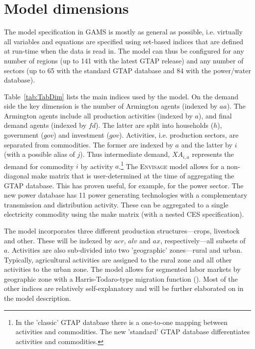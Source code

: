 \documentclass[11pt,letterpaper]{report}
\begin{document}
\section{Model dimensions}

The model specification in GAMS is mostly as general as possible, i.e. virtually
all variables and equations are specified using set-based indices that are
defined at run-time when the data is read in. The model can thus be configured
for any number of regions (up to 141 with the latest GTAP release) and any
number of sectors (up to 65 with the standard GTAP database and 84 with the
power/water database).

Table~\ref{tab:TabDim} lists the main indices used by the model. On the demand
side the key dimension is the number of Armington agents (indexed by
$\mathit{aa}$). The Armington agents include all production activities
(indexed by $a$), and final demand agents (indexed by $\mathit{fd}$). The latter
are split into households ($h$), government ($\mathit{gov}$) and investment
($\mathit{gov}$). Activities, i.e. production sectors, are separated from
commodities. The former are indexed by $a$ and the latter by $i$ (with a
possible alias of $j$). Thus intermediate demand, $\mathit{XA}_{i,a}$ represents
the demand for commodity $i$ by activity $a$.\footnote{In the 'classic' GTAP
database there is a one-to-one mapping between activities and commodities. The
new 'standard' GTAP database differentiates activities and commodities.} The
\textsc{Envisage} model allows for a non-diagonal make matrix that is
user-determined at the time of aggregating the GTAP database. This has proven
useful, for example, for the power sector. The new power database has 11 power
generating technologies with a complementary transmission and distribution
activity. These can be aggregated to a single electricity commodity using the
make matrix (with a nested CES specification).

The model incorporates three different production structures---crops, livestock
and other. These will be indexed by $\mathit{acr}$, $\mathit{alv}$ and
$\mathit{ax}$, respectively---all subsets of $a$. Activities are also
sub-divided into two 'geographic' zones---rural and urban. Typically,
agricultural activities are assigned to the rural zone and all other activities
to the urban zone. The model allows for segmented labor markets by geographic
zone with a Harris-Todaro-type migration function (\cite{HarrisTodaro1970}).
Most of the other indices are relatively self-explanatory and will be further
elaborated on in the model description.
\end{document}
